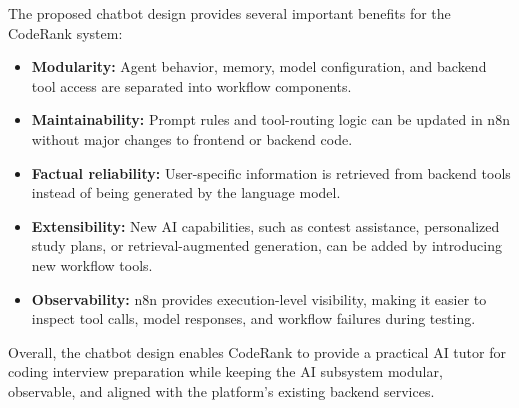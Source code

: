 The proposed chatbot design provides several important benefits for the CodeRank system:
\begin{itemize}
    \item \textbf{Modularity:} Agent behavior, memory, model configuration, and backend tool access are separated into workflow components.
    
    \item \textbf{Maintainability:} Prompt rules and tool-routing logic can be updated in n8n without major changes to frontend or backend code.
    
    \item \textbf{Factual reliability:} User-specific information is retrieved from backend tools instead of being generated by the language model.
    
    \item \textbf{Extensibility:} New AI capabilities, such as contest assistance, personalized study plans, or retrieval-augmented generation, can be added by introducing new workflow tools.
    
    \item \textbf{Observability:} n8n provides execution-level visibility, making it easier to inspect tool calls, model responses, and workflow failures during testing.
\end{itemize}

Overall, the chatbot design enables CodeRank to provide a practical AI tutor for coding interview preparation while keeping the AI subsystem modular, observable, and aligned with the platform's existing backend services.
